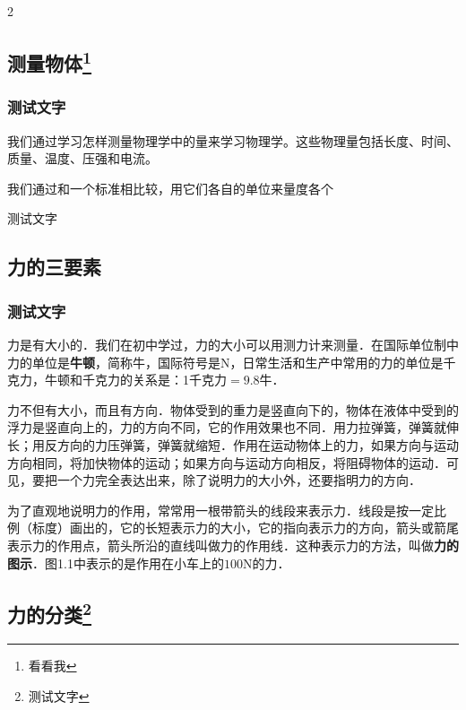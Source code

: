 \begin{Project}
\begin{paracol}{2}
	\subsection{测量物体\protect\footnote{看看我}}
	
	\subsubsection{测试文字}
	
	我们通过学习怎样测量物理学中的量来学习物理学。这些物理量包括长度、时间、质量、温度、压强和电流。
	
	我们通过和一个标准相比较，用它们各自的单位来量度各个
	
	\begin{Lemma}
		测试文字
	\end{Lemma}
	
	
	
\end{paracol}

\subsection{力的三要素}


\subsubsection*{测试文字}

力是有大小的．我们在初中学过，力的大小可以用测力计来测量．在国际单位制中力的单位是\textbf{牛顿}，简称牛，国际符号是N，日常生活和生产中常用的力的单位是千克力，牛顿和千克力的关系是：1千克力$=9.8$牛．

力不但有大小，而且有方向．物体受到的重力是竖直向下的，物体在液体中受到的浮力是竖直向上的，力的方向不同，它的作用效果也不同．用力拉弹簧，弹簧就伸长；用反方向的力压弹簧，弹簧就缩短．作用在运动物体上的力，如果方向与运动方向相同，将加快物体的运动；如果方向与运动方向相反，将阻碍物体的运动．可见，要把一个力完全表达出来，除了说明力的大小外，还要指明力的方向．


为了直观地说明力的作用，常常用一根带箭头的线段来表示力．线段是按一定比
例（标度）画出的，它的长短表示力的大小，它的指向表示力的方向，箭头或箭尾表示力的作用点，箭头所沿的直线叫做力的作用线．这种表示力的方法，叫做\textbf{力的图示}．图1.1中表示的是作用在小车上的$100$N的力．

\subsection{力的分类\protect\footnote{测试文字}}


\end{Project}
